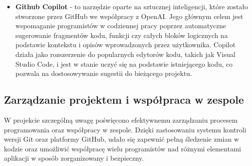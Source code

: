 \begin{itemize}
    \item \textbf{Github Copilot} - to narzędzie oparte na sztucznej inteligencji, które zostało stworzone przez GitHub we współpracy z OpenAI. Jego głównym celem jest wspomaganie programistów w codziennej pracy poprzez automatyczne sugerowanie fragmentów kodu, funkcji czy całych bloków logicznych na podstawie kontekstu i opisów wprowadzonych przez użytkownika. Copilot działa jako rozszerzenie do popularnych edytorów kodu, takich jak Visual Studio Code, i jest w stanie uczyć się na podstawie istniejącego kodu, co pozwala na dostosowywanie sugestii do bieżącego projektu.
\end{itemize}
\subsection{Zarządzanie projektem i współpraca w zespole}
W projekcie szczególną uwagę poświęcono efektywnemu zarządzaniu procesem programowania oraz współpracy w zespole. Dzięki zastosowaniu systemu kontroli wersji Git oraz platformy GitHub, udało się zapewnić pełną śledzenie zmian w kodzie oraz umożliwić współpracę wielu programistów nad różnymi elementami aplikacji w sposób zorganizowany i bezpieczny. 
